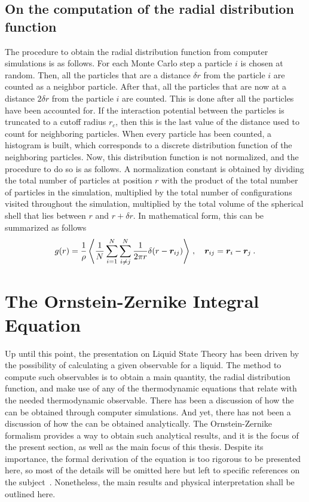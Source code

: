 \subsection{On the computation of the radial distribution function}
The procedure to obtain the radial distribution function from computer simulations is as
follows. For each Monte Carlo step a particle $i$ is chosen at random.
Then, all the particles that are a distance $\delta r$ from the particle $i$ are counted
as a neighbor particle. After that, all the particles that are now at a distance
$2 \delta r$ from the particle $i$ are counted. This is done after all the particles
have been accounted for. If the interaction potential between the particles is truncated
to a cutoff radius $r_c$, then this is the last value of the distance used to count
for neighboring particles. When every particle has been counted, a histogram is built,
which corresponds to a discrete distribution function of the neighboring particles. 
Now, this distribution function is not normalized, and the procedure to do so is as 
follows. A normalization constant is obtained by dividing the total number of particles at 
position $r$ with the product of the total number of particles in the simulation, 
multiplied by the total number of configurations visited throughout the simulation, 
multiplied by the total volume of the spherical shell that lies between $r$ and $r + \delta 
r$. In mathematical form, this can be summarized as follows
\begin{equation}
    g(r)=\frac{1}{\rho} \left\langle \frac{1}{N} \sum_{i=1}^{N} \sum_{i \neq j}^{N} 
    \frac{1}{2 \pi r} \delta (r - \bm{r}_{ij}) \right\rangle
    \, , \quad
    \bm{r}_{ij}=\bm{r}_{i} - \bm{r}_{j} \: .
    \label{eq:rdf-simulation}
\end{equation}

\section{The Ornstein-Zernike Integral Equation}
Up until this point, the presentation on Liquid State Theory has been driven by the
possibility of calculating a given observable for a liquid. The method to compute such
observables is to obtain a main quantity, the radial distribution function, and
make use of any of the thermodynamic equations that relate \rdf with the needed
thermodynamic observable. There has been a discussion of how the \rdf can be obtained
through computer simulations. And yet, there has not been a discussion of how the \rdf
can be obtained analytically. The Ornstein-Zernike formalism provides a way to obtain
such analytical results, and it is the focus of the present section, as well as the main 
focus of this thesis. Despite its importance, the formal derivation of the equation is too 
rigorous to be presented here, so most of the details will be omitted here but left to 
specific references on the subject~\cite{hansenTheorySimpleLiquids2013}. Nonetheless, the 
main results and physical interpretation shall be outlined here.

